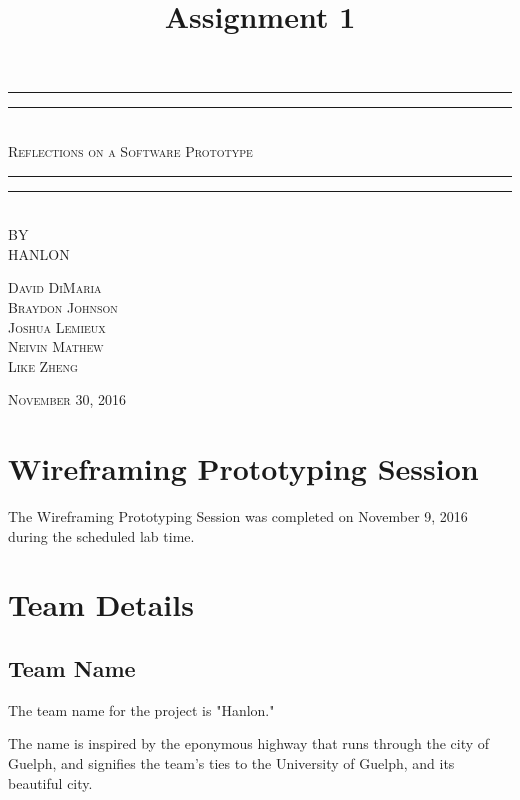 \documentclass[12pt,letterpaper]{article}
\title{Assignment 1}
\begin{document}
\begin{titlepage}
    \centering
    \vspace*{\baselineskip}
    \rule{\textwidth}{1.6pt}\vspace*{-\baselineskip}\vspace*{2pt}
    \rule{\textwidth}{0.4pt}\\[1.5\baselineskip]
    {\LARGE \textsc{Reflections on a Software Prototype}}\\[\baselineskip]
	\rule{\textwidth}{0.4pt}\vspace*{-\baselineskip}\vspace{4pt}    
    \rule{\textwidth}{2pt}\\[2\baselineskip]
   
    \vspace*{5\baselineskip}
    \textsc{BY}\\[0.25\baselineskip]
    {\LARGE HANLON} \\
    
    \vspace*{\baselineskip}
    {\textsc{David DiMaria \\ Braydon Johnson \\ Joshua Lemieux \\ Neivin Mathew \\ Like Zheng} \par}
    \vfill
    {\scshape November 30, 2016} \\
  \end{titlepage}
  
  
\tableofcontents
\lhead{} %
\clearpage
{} %
    
\clearpage
\section{Wireframing Prototyping Session}
The Wireframing Prototyping Session was completed on November 9, 2016 during the scheduled lab time.
\section{Team Details}
\subsection{Team Name}
The team name for the project is "Hanlon."\par
The name is inspired by the eponymous highway that runs through the city of Guelph, and signifies the team's ties to the University of Guelph, and its beautiful city.\\
\end{document}
